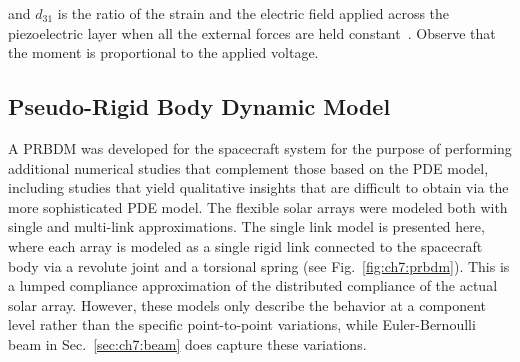 \noindent and $d_{31}$ is the ratio of the strain and the electric field applied across the piezoelectric layer when all the external forces are held constant~\cite{Moheimani2006a}. Observe that the moment is proportional to the applied voltage.

\subsection{Pseudo-Rigid Body Dynamic Model}

A PRBDM was developed for the spacecraft system for the purpose of performing additional numerical studies that complement those based on the PDE model, including studies that yield qualitative insights that are difficult to obtain via the more sophisticated PDE model. The flexible solar arrays were modeled both with single and multi-link approximations. The single link model is presented here, where each array is modeled as a single rigid link connected to the spacecraft body via a revolute joint and a torsional spring (see Fig.~\ref{fig:ch7:prbdm}). This is a lumped compliance approximation of the distributed compliance of the actual solar array. However, these models only describe the behavior at a component level rather than the specific point-to-point variations, while Euler-Bernoulli beam in Sec.~\ref{sec:ch7:beam} does capture these variations.

